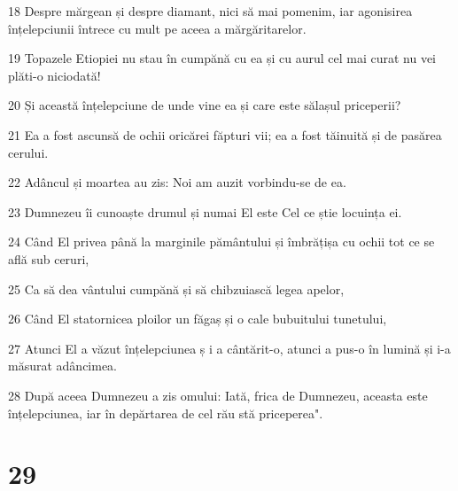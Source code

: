 \par 18 Despre mărgean și despre diamant, nici să mai pomenim, iar agonisirea înțelepciunii întrece cu mult pe aceea a mărgăritarelor.
\par 19 Topazele Etiopiei nu stau în cumpănă cu ea și cu aurul cel mai curat nu vei plăti-o niciodată!
\par 20 Și această înțelepciune de unde vine ea și care este sălașul priceperii?
\par 21 Ea a fost ascunsă de ochii oricărei făpturi vii; ea a fost tăinuită și de pasărea cerului.
\par 22 Adâncul și moartea au zis: Noi am auzit vorbindu-se de ea.
\par 23 Dumnezeu îi cunoaște drumul și numai El este Cel ce știe locuința ei.
\par 24 Când El privea până la marginile pământului și îmbrățișa cu ochii tot ce se află sub ceruri,
\par 25 Ca să dea vântului cumpănă și să chibzuiască legea apelor,
\par 26 Când El statornicea ploilor un făgaș și o cale bubuitului tunetului,
\par 27 Atunci El a văzut înțelepciunea ș i a cântărit-o, atunci a pus-o în lumină și i-a măsurat adâncimea.
\par 28 După aceea Dumnezeu a zis omului: Iată, frica de Dumnezeu, aceasta este înțelepciunea, iar în depărtarea de cel rău stă priceperea".

\chapter{29}

